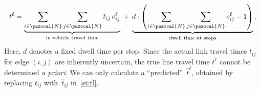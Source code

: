 \documentclass[a4paper,fleqn]{cas-sc}
\begin{document}
\begin{align}
t^\ell
=
\underbrace{\sum_{i \in \pazocal{N}} \sum_{j \in \pazocal{N}} t_{ij} \, e_{ij}^\ell}_{\text{in-vehicle travel time}}
\;+\;
\underbrace{d \cdot \left(
\sum_{i \in \pazocal{N}} \sum_{j \in \pazocal{N}} e_{ij}^\ell - 1
\right)}_{\text{dwell time at stops}} .
\label{st:tl}
\end{align}
%
%
Here, $d$ denotes a fixed dwell time per stop. Since the actual link travel times $t_{ij}$ for edge $(i, j)$ are inherently uncertain, the true line travel time $t^\ell$ cannot be determined \textit{a priori}. We can only calculate a ``predicted''~$\hat t^\ell$, obtained by replacing $t_{ij}$ with~$\hat t_{ij}$ in~\eqref{st:tl}.
\end{document}
